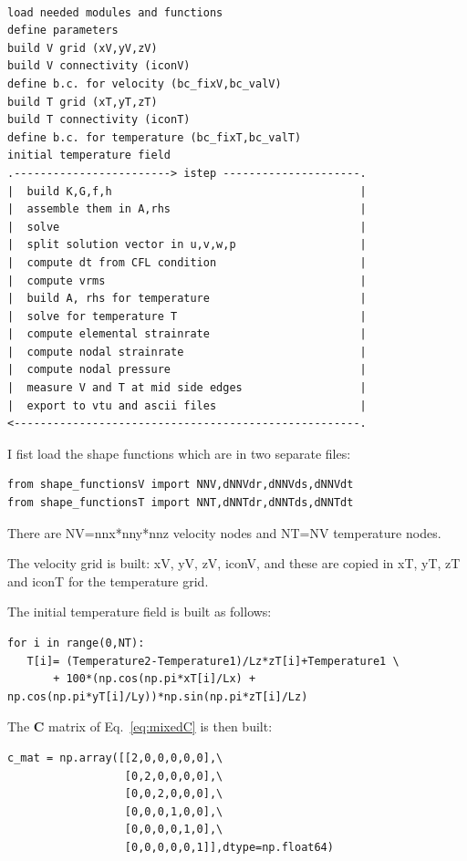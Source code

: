 \begin{verbatim}

load needed modules and functions
define parameters
build V grid (xV,yV,zV)
build V connectivity (iconV)
define b.c. for velocity (bc_fixV,bc_valV)
build T grid (xT,yT,zT)
build T connectivity (iconT)
define b.c. for temperature (bc_fixT,bc_valT)
initial temperature field
.------------------------> istep ---------------------.
|  build K,G,f,h                                      |
|  assemble them in A,rhs                             |
|  solve                                              |
|  split solution vector in u,v,w,p                   |
|  compute dt from CFL condition                      |
|  compute vrms                                       |
|  build A, rhs for temperature                       |
|  solve for temperature T                            |
|  compute elemental strainrate                       |
|  compute nodal strainrate                           |
|  compute nodal pressure                             |
|  measure V and T at mid side edges                  |
|  export to vtu and ascii files                      | 
<-----------------------------------------------------.
\end{verbatim}

I fist load the shape functions which are in two separate files:

\begin{lstlisting}
from shape_functionsV import NNV,dNNVdr,dNNVds,dNNVdt
from shape_functionsT import NNT,dNNTdr,dNNTds,dNNTdt
\end{lstlisting}

There are NV=nnx*nny*nnz velocity nodes and NT=NV temperature nodes.

The velocity grid is built: xV, yV, zV, iconV, and 
these are copied in xT, yT, zT and iconT for the temperature grid.  

The initial temperature field is built as follows:
\begin{lstlisting}
for i in range(0,NT):
   T[i]= (Temperature2-Temperature1)/Lz*zT[i]+Temperature1 \
       + 100*(np.cos(np.pi*xT[i]/Lx) + np.cos(np.pi*yT[i]/Ly))*np.sin(np.pi*zT[i]/Lz)
\end{lstlisting}

The ${\bm C}$ matrix of Eq.~\ref{eq:mixedC} is then built:
\begin{lstlisting}
c_mat = np.array([[2,0,0,0,0,0],\
                  [0,2,0,0,0,0],\
                  [0,0,2,0,0,0],\
                  [0,0,0,1,0,0],\
                  [0,0,0,0,1,0],\
                  [0,0,0,0,0,1]],dtype=np.float64) 
\end{lstlisting}




